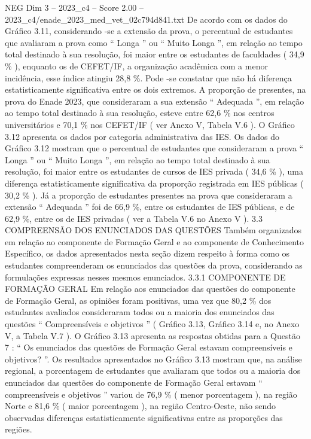 \begin{textsample}{NEG Dim 3 – 2023\_c4 – Score 2.00 – 2023\_c4/enade\_2023\_med\_vet\_02c794d841.txt}
De acordo com os dados do Gráfico 3.11, considerando -se a extensão da prova, o percentual de estudantes que avaliaram a prova como “ Longa ” ou “ Muito Longa ”, em relação ao tempo total destinado à sua resolução, foi maior entre os estudantes de faculdades ( 34,9 \% ), enquanto os de CEFET/IF, a organização acadêmica com a menor incidência, esse índice atingiu 28,8 \%.
Pode -se constatar que não há diferença estatisticamente significativa entre os dois extremos.
A proporção de presentes, na prova do Enade 2023, que consideraram a sua extensão “ Adequada ”, em relação ao tempo total destinado à sua resolução, esteve entre 62,6 \% nos centros universitários e 70,1 \% nos CEFET/IF ( ver Anexo V, Tabela V.6 ).
O Gráfico 3.12 apresenta os dados por categoria administrativa das IES.
Os dados do Gráfico 3.12 mostram que o percentual de estudantes que consideraram a prova “ Longa ” ou “ Muito Longa ”, em relação ao tempo total destinado à sua resolução, foi maior entre os estudantes de cursos de IES privada ( 34,6 \% ), uma diferença estatisticamente significativa da proporção registrada em IES públicas ( 30,2 \% ).
Já a proporção de estudantes presentes na prova que consideraram a extensão “ Adequada ” foi de 66,9 \%, entre os estudantes de IES públicas, e de 62,9 \%, entre os de IES privadas ( ver a Tabela V.6 no Anexo V ). 3.3 COMPREENSÃO DOS ENUNCIADOS DAS QUESTÕES Também organizados em relação ao componente de Formação Geral e ao componente de Conhecimento Específico, os dados apresentados nesta seção dizem respeito à forma como os estudantes compreenderam os enunciados das questões da prova, considerando as formulações expressas nesses mesmos enunciados. 3.3.1 COMPONENTE DE FORMAÇÃO GERAL Em relação aos enunciados das questões do componente de Formação Geral, as opiniões foram positivas, uma vez que 80,2 \% dos estudantes avaliados consideraram todos ou a maioria dos enunciados das questões “ Compreensíveis e objetivos ” ( Gráfico 3.13, Gráfico 3.14 e, no Anexo V, a Tabela V.7 ).
O Gráfico 3.13 apresenta as respostas obtidas para a Questão 7 : “ Os enunciados das questões de Formação Geral estavam compreensíveis e objetivos? ”.
Os resultados apresentados no Gráfico 3.13 mostram que, na análise regional, a porcentagem de estudantes que avaliaram que todos ou a maioria dos enunciados das questões do componente de Formação Geral estavam “ compreensíveis e objetivos ” variou de 76,9 \% ( menor porcentagem ), na região Norte e 81,6 \% ( maior porcentagem ), na região Centro-Oeste, não sendo observadas diferenças estatisticamente significativas entre as proporções das regiões.

\end{textsample}
